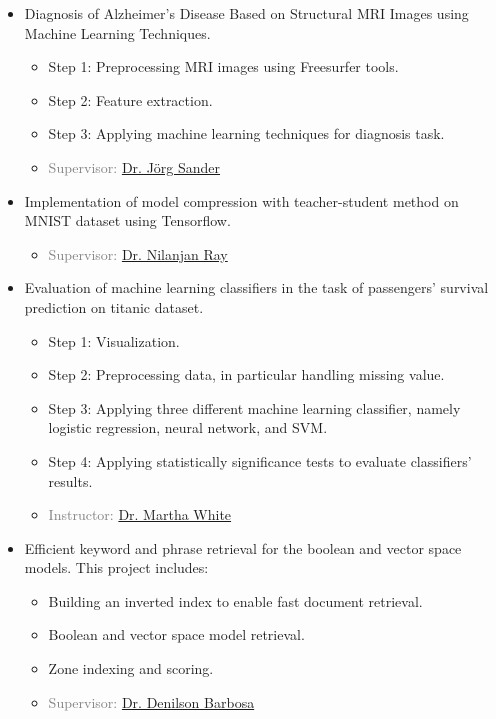 	\begin{itemize}
		
		\item Diagnosis of Alzheimer’s Disease Based on Structural MRI Images using Machine Learning Techniques.
		\begin{itemize}
			\item Step 1: Preprocessing MRI images using Freesurfer tools.
			\item Step 2: Feature extraction.
			\item Step 3: Applying machine learning techniques for diagnosis task.
			\item \textcolor{gray}{Supervisor: \href{http://webdocs.cs.ualberta.ca/~joerg/}{Dr. Jörg Sander}}
			
		\end{itemize}
	
		\item Implementation of model compression with teacher-student method on MNIST dataset using Tensorflow.
		\begin{itemize}
			\item \textcolor{gray}{Supervisor: \href{https://webdocs.cs.ualberta.ca/~nray1/}{Dr. Nilanjan Ray}}
		\end{itemize}
		
		\item Evaluation of machine learning classifiers in the task of passengers' survival prediction on titanic dataset.
		\begin{itemize}
			\item Step 1: Visualization.
			\item Step 2: Preprocessing data, in particular handling missing value.
			\item Step 3: Applying three different machine learning classifier, namely logistic regression, neural network, and SVM.
			\item Step 4: Applying statistically significance tests to evaluate classifiers' results.
			\item \textcolor{gray}{Instructor: \href{http://webdocs.cs.ualberta.ca/~whitem/}{Dr. Martha White}}
		\end{itemize}
	
		\item Efficient keyword and phrase retrieval for the boolean and vector space models. This project includes:
		\begin{itemize}
			\item Building an inverted index to enable fast document retrieval.
			\item Boolean and vector space model retrieval.
			\item Zone indexing and scoring.
			\item \textcolor{gray}{Supervisor: \href{https://sites.ualberta.ca/~denilson/}{Dr. Denilson Barbosa}}
		\end{itemize}
	

\end{itemize}
